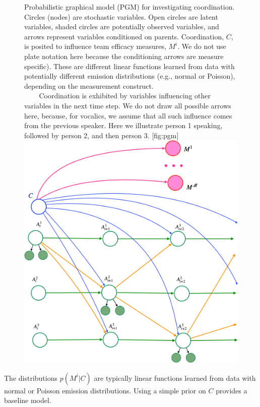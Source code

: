 %
    \begin{figure}
        \begin{sidecaption}{%
            Probabilistic graphical model (PGM) for investigating coordination.
            Circles (nodes) are stochastic variables.  Open circles are latent
            variables, shaded circles are potentially observed variables, and
            arrows represent variables conditioned on parents.  Coordination,
            $C$, is posited to influence team efficacy measures, $M^i$.  We do
            not use plate notation here because the conditioning arrows are
            measure specific). These are different linear functions learned
            from data with potentially different emission distributions (e.g.,
            normal or Poisson), depending on the measurement construct. \\
            $~~~~~~~~$ Coordination is exhibited by variables influencing other
            variables in the next time step. We do not draw all possible arrows
            here, because, for vocalics, we assume that all  such influence
            comes from the previous speaker.  Here we illustrate person 1
            speaking, followed by person 2, and then person 3.
        }[fig:pgm]
        \includegraphics[width=\textwidth]{../images/prereg-pgm.pdf}
        \end{sidecaption}
    \end{figure}
%
    The distributions $p(M^i|C)$ are typically linear functions learned from data
    with normal or Poisson emission distributions. Using a simple prior on $C$
    provides a baseline model.

